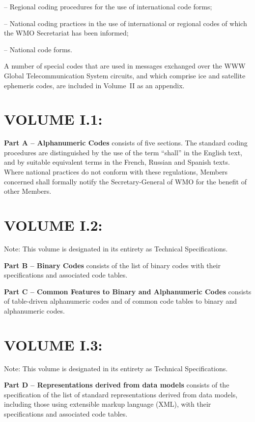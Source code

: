-- Regional coding procedures for the use of international code forms;

-- National coding practices in the use of international or regional codes of which the WMO Secretariat has been informed;

-- National code forms.

A number of special codes that are used in messages exchanged over the WWW Global Telecommunication System circuits, and which comprise ice and satellite ephemeris codes, are included in Volume~II as an appendix.

\hypertarget{volume-i.1}{%
\section{VOLUME I.1:}\label{volume-i.1}}

\textbf{Part A -- Alphanumeric Codes} consists of five sections. The standard coding procedures are distinguished by the use of the term ``shall'' in the English text, and by suitable equivalent terms in the French, Russian and Spanish texts. Where national practices do not conform with these regulations, Members concerned shall formally notify the Secretary-General of WMO for the benefit of other Members.

\hypertarget{volume-i.2}{%
\section{VOLUME I.2:}\label{volume-i.2}}

Note: This volume is designated in its entirety as Technical Specifications.

\textbf{Part B -- Binary Codes} consists of the list of binary codes with their specifications and associated code tables.

\textbf{Part C -- Common Features to Binary and Alphanumeric Codes} consists of table-driven alphanumeric codes and of common code tables to binary and alphanumeric codes.

\hypertarget{volume-i.3}{%
\section{VOLUME I.3:}\label{volume-i.3}}

Note: This volume is designated in its entirety as Technical Specifications.

\textbf{Part D -- Representations derived from data models} consists of the specification of the list of standard representations derived from data models, including those using extensible markup language (XML), with their specifications and associated code tables.


